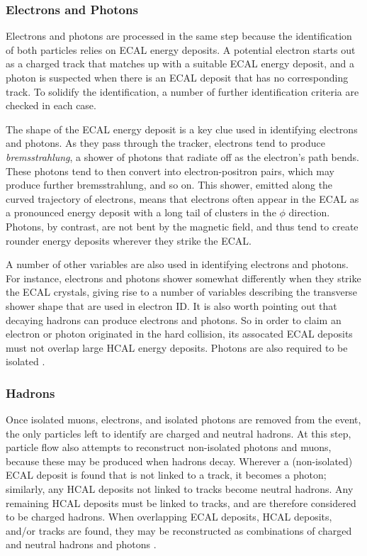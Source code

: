 \subsubsection{Electrons and Photons}
\label{sssec:cms:pf:egamma}

Electrons and photons are processed in the same step because the
identification of both particles relies on ECAL energy deposits. A
potential electron starts out as a charged track that matches up with
a suitable ECAL energy deposit, and a photon is suspected when there
is an ECAL deposit that has no corresponding track. To solidify the
identification, a number of further identification criteria are
checked in each case.

The shape of the ECAL energy deposit is a key clue used in identifying
electrons and photons. As they pass through the tracker, electrons
tend to produce \emph{bremsstrahlung}, a shower of photons that
radiate off as the electron's path bends. These photons tend to then
convert into electron-positron pairs, which may produce further
bremsstrahlung, and so on. This shower, emitted along the curved
trajectory of electrons, means that electrons often appear in the ECAL
as a pronounced energy deposit with a long tail of clusters in the $\phi$
direction. Photons, by contrast, are not bent by the magnetic field,
and thus tend to create rounder energy deposits wherever they strike
the ECAL.

A number of other variables are also used in identifying electrons and
photons. For instance, electrons and photons shower somewhat
differently when they strike the ECAL crystals, giving rise to a
number of variables describing the transverse shower shape that are
used in electron ID. It is also worth pointing out that decaying
hadrons can produce electrons and photons. So in order to
claim an electron or photon originated in the hard collision, its
assocated ECAL deposits must not overlap large HCAL energy
deposits. Photons are also required to be isolated \cite{particleflow}.

\subsubsection{Hadrons}
\label{sssec:cms:pf:hadrons}

Once isolated muons, electrons, and isolated photons are removed from
the event, the only particles left to identify are charged and neutral
hadrons. At this step, particle flow also attempts to reconstruct
non-isolated photons and muons, because these may be produced when
hadrons decay. Wherever a (non-isolated) ECAL deposit is found that is
not linked to a track, it becomes a photon; similarly, any HCAL
deposits not linked to tracks become neutral hadrons. Any remaining
HCAL deposits must be linked to tracks, and are therefore considered
to be charged hadrons. When overlapping ECAL deposits, HCAL deposits,
and/or tracks are found, they may be reconstructed as combinations of
charged and neutral hadrons and photons \cite{particleflow}.

